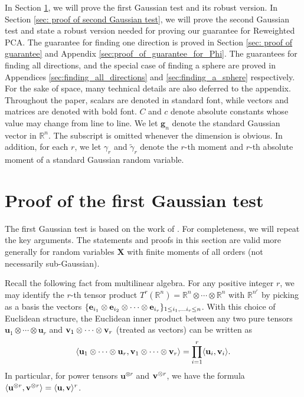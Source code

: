 \documentclass[final,12pt]{colt2018} %
\numberwithin{equation}{section}
\DeclarePairedDelimiter{\braces}{\lbrace}{\rbrace}
\DeclarePairedDelimiter{\inprod}{\langle}{\rangle}
\newcommand{\R}{\mathbb{R}}
\newcommand{\boldg}{\textbf{g}}
\newcommand{\boldv}{\textbf{v}}
\newcommand{\boldX}{\textbf{X}}
\newcommand{\tensor}{\otimes}
\begin{document}
In Section \ref{sec: proof of first Gaussian test}, we will prove the first Gaussian test and its robust version. In Section \ref{sec: proof of second Gaussian test}, we will prove the second Gaussian test and state a robust version needed for proving our guarantee for Reweighted PCA. The guarantee for finding one direction is proved in Section \ref{sec: proof of guarantee} and Appendix \ref{sec:proof_of_guarantee_for_Phi}. The guarantees for finding all directions, and the special case of finding a sphere are proved in Appendices \ref{sec:finding_all_directions} and \ref{sec:finding_a_sphere} respectively. For the sake of space, many technical details are also deferred to the appendix. Throughout the paper, scalars are denoted in standard font, while vectors and matrices are denoted with bold font. $C$ and $c$ denote absolute constants whose value may change from line to line. We let $\boldg_n$ denote the standard Gaussian vector in $\R^n$. The subscript is omitted whenever the dimension is obvious. In addition, for each $r$, we let $\gamma_r$ and $\tilde{\gamma}_r$ denote the $r$-th moment and $r$-th absolute moment of a standard Gaussian random variable.

\section{Proof of the first Gaussian test} \label{sec: proof of first Gaussian test}

The first Gaussian test is based on the work of \cite{Tan2016}. For completeness, we will repeat the key arguments. The statements and proofs in this section are valid more generally for random variables $\boldX$ with finite moments of all orders (not necessarily sub-Gaussian).

Recall the following fact from multilinear algebra. For any positive integer $r$, we may identify the $r$-th tensor product $T^r(\R^n) = \R^n\tensor\cdots\tensor\R^n$ with $\R^{n^r}$ by picking as a basis the vectors $\braces{\textbf{e}_{i_1}\tensor \textbf{e}_{i_2}\tensor\cdots\tensor \textbf{e}_{i_r}}_{1\leq i_1,\ldots i_r \leq n}$. With this choice of Euclidean structure, the Euclidean inner product between any two pure tensors $\textbf{u}_1\tensor\cdots\tensor \textbf{u}_r$ and $\textbf{\boldv}_1\tensor\cdots\tensor \textbf{\boldv}_r$ (treated as vectors) can be written as
\[
\inprod{\textbf{u}_1\tensor\cdots\tensor \textbf{u}_r,\textbf{\boldv}_1\tensor\cdots\tensor \textbf{\boldv}_r} = \prod_{i=1}^r\inprod{\textbf{u}_i,\textbf{\boldv}_i}.
\]
In particular, for power tensors $\textbf{u}^{\tensor r}$ and $\textbf{\boldv}^{\tensor r}$, we have the formula $\inprod{\textbf{u}^{\tensor r},\textbf{\boldv}^{\tensor r}} = \inprod{\textbf{u},\textbf{\boldv}}^r$.
\end{document}
